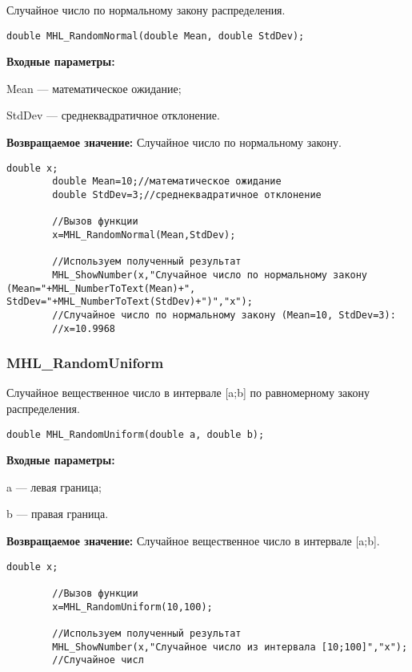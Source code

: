 \documentclass[a4paper,12pt]{article}
\begin{document}
Случайное число по нормальному закону распределения.


\begin{lstlisting}[label=code_syntax_MHL_RandomNormal,caption=Синтаксис]
double MHL_RandomNormal(double Mean, double StdDev);
\end{lstlisting}

\textbf{Входные параметры:}

Mean --- математическое ожидание;

 StdDev --- среднеквадратичное отклонение.

\textbf{Возвращаемое значение:}
Случайное число по нормальному закону.


\begin{lstlisting}[label=code_use_MHL_RandomNormal,caption=Пример использования]
        double x;
        double Mean=10;//математическое ожидание
        double StdDev=3;//среднеквадратичное отклонение

        //Вызов функции
        x=MHL_RandomNormal(Mean,StdDev);

        //Используем полученный результат
        MHL_ShowNumber(x,"Случайное число по нормальному закону (Mean="+MHL_NumberToText(Mean)+", StdDev="+MHL_NumberToText(StdDev)+")","x");
        //Случайное число по нормальному закону (Mean=10, StdDev=3):
        //x=10.9968
\end{lstlisting}

\subsubsection{MHL\_RandomUniform}\label{MHL_RandomUniform}

Случайное вещественное число в интервале [a;b] по равномерному закону распределения.


\begin{lstlisting}[label=code_syntax_MHL_RandomUniform,caption=Синтаксис]
double MHL_RandomUniform(double a, double b);
\end{lstlisting}

\textbf{Входные параметры:}

 a --- левая граница;
  
 b --- правая граница.

\textbf{Возвращаемое значение:}
Случайное вещественное число в интервале [a;b].


\begin{lstlisting}[label=code_use_MHL_RandomUniform,caption=Пример использования]
        double x;

        //Вызов функции
        x=MHL_RandomUniform(10,100);

        //Используем полученный результат
        MHL_ShowNumber(x,"Случайное число из интервала [10;100]","x");
        //Случайное числ
\end{lstlisting}
\end{document}
